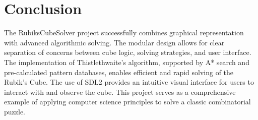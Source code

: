 \documentclass[11pt, a4paper]{article}
\begin{document}
\section{Conclusion}
The RubiksCubeSolver project successfully combines graphical representation with advanced algorithmic solving. The modular design allows for clear separation of concerns between cube logic, solving strategies, and user interface. The implementation of Thistlethwaite's algorithm, supported by A* search and pre-calculated pattern databases, enables efficient and rapid solving of the Rubik's Cube. The use of SDL2 provides an intuitive visual interface for users to interact with and observe the cube. This project serves as a comprehensive example of applying computer science principles to solve a classic combinatorial puzzle.
\end{document}
